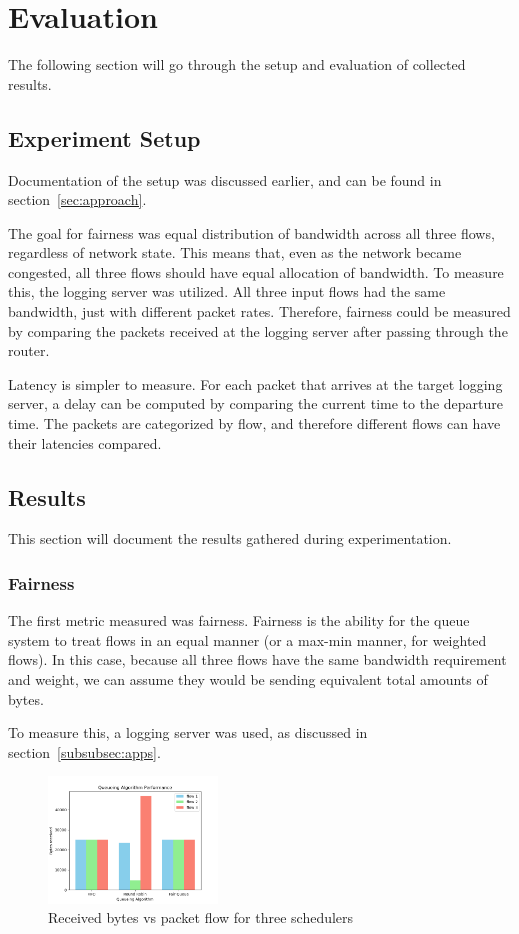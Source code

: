 \documentclass[conference]{IEEEtran}
\begin{document}
    \section{Evaluation}
The following section will go through the setup and evaluation of collected results.

    \subsection{Experiment Setup}
Documentation of the setup was discussed earlier, and can be found in section~\ref{sec:approach}.

The goal for fairness was equal distribution of bandwidth across all three flows, regardless of network state.
This means that, even as the network became congested, all three flows should have equal allocation of bandwidth.
To measure this, the logging server was utilized.
All three input flows had the same bandwidth, just with different packet rates.
Therefore, fairness could be measured by comparing the packets received at the logging server after passing through the router.

Latency is simpler to measure.
For each packet that arrives at the target logging server, a delay can be computed by comparing the current time to the departure
time.
The packets are categorized by flow, and therefore different flows can have their latencies compared.

    \subsection{Results} \label{subsec:results}
This section will document the results gathered during experimentation.

    \subsubsection{Fairness}
The first metric measured was fairness.
Fairness is the ability for the queue system to treat flows in an equal manner (or a max-min manner, for weighted flows).
In this case, because all three flows have the same bandwidth requirement and weight, we can assume they would be sending
equivalent total amounts of bytes.

To measure this, a logging server was used, as discussed in section~\ref{subsubsec:apps}.

\begin{figure}[htbp]
    \centering
    \includegraphics[width=0.4\textwidth]{../img/fairness_bar}
    \caption{Received bytes vs packet flow for three schedulers}
    \label{fig:fairness_bar}
\end{figure}
\end{document}
